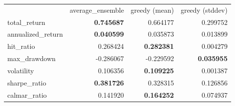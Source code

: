 \begin{tabular}{lrrr}
 & average_ensemble & greedy (mean) & greedy (stddev) \\
total_return & \bfseries 0.745687 & 0.664177 & 0.299752 \\
annualized_return & \bfseries 0.040599 & 0.035873 & 0.013899 \\
hit_ratio & 0.268424 & \bfseries 0.282381 & 0.004279 \\
max_drawdown & -0.286067 & -0.229592 & \bfseries 0.035955 \\
volatility & 0.106356 & \bfseries 0.109225 & 0.001387 \\
sharpe_ratio & \bfseries 0.381726 & 0.328315 & 0.126856 \\
calmar_ratio & 0.141920 & \bfseries 0.164252 & 0.074937 \\
\end{tabular}
